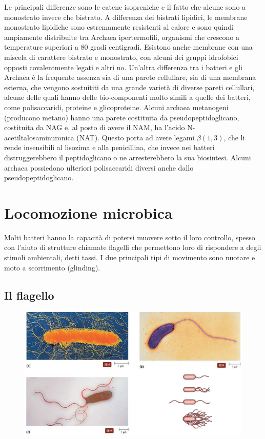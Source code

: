 Le principali differenze sono le catene isopreniche e il fatto che alcune sono 
a monostrato invece che bistrato. A differenza dei bistrati lipidici, le membrane monostrato lipidiche sono estremamente resistenti al calore e sono quindi 
ampiamente distribuite tra Archaea ipertermofili, organismi che crescono a temperature superiori a 80 gradi centigradi. Esistono anche membrane con una 
miscela di carattere bistrato e monostrato, con alcuni dei gruppi idrofobici opposti covalentmente legati e altri no. Un’altra differenza tra i batteri e 
gli Archaea è la frequente assenza sia di una parete cellullare, sia di una membrana esterna, che vengono sostuititi da una grande varietà di diverse pareti 
cellullari, alcune delle quali hanno delle bio-componenti molto simili a quelle dei batteri, come polisaccaridi, proteine e glicoproteine. Alcuni archaea 
metanogeni (producono metano) hanno una parete costituita da pseudopeptidoglicano, costituita da NAG e, al posto di avere il NAM, ha 
l’acido N-acetiltalosaminuronica (NAT). Questo porta ad avere legami $\beta(1, 3)$, che li rende insensibili al lisozima e 
alla penicillina, che invece nei batteri distruggerebbero il peptidoglicano o ne arresterebbero la sua biosintesi. Alcuni archaea possiedono ulteriori polisaccaridi diversi anche dallo pseudopeptidoglicano.
\section{Locomozione microbica}
Molti batteri hanno la capacità di potersi muovere sotto il loro controllo, spesso con l’aiuto di strutture chiamate flagelli che 
permettono loro di rispondere a degli stimoli ambientali, detti tassi. I due principali tipi di movimento sono nuotare e moto a 
scorrimento (glinding). 
\subsection{Il flagello}
\begin{figure}[H]
	\includegraphics[width=\textwidth]{Pictures/14.png}
\end{figure}

